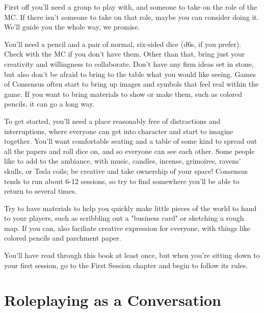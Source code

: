 \documentclass[
  oneside,
  statementpaper,
  9pt]{memoir}
\begin{document}
\begin{Player}

First off you'll need a group to play with, and someone to take on the role of the MC. If there isn't someone to take on that role, maybe you can consider doing it. We'll guide you the whole way, we promise.

You'll need a pencil and a pair of normal, six-sided dice (d6s, if you prefer). Check with the MC if you don't have them. Other than that, bring just your creativity and willingness to collaborate. Don't have any firm ideas set in stone, but also don't be afraid to bring to the table what you would like seeing. Games of Consensus often start to bring up images and symbols that feel real within the game. If you want to bring materials to show or make them, such as colored pencils, it can go a long way.

\end{Player}

\begin{MC}

To get started, you’ll need a place reasonably free of distractions and interruptions, where everyone can get into character and start to imagine together. You’ll want comfortable seating and a table of some kind to spread out all the papers and roll dice on, and so everyone can see each other. Some people like to add to the ambiance, with music, candles, incense, grimoires, ravens’ skulls, or Tesla coils; be creative and take ownership of your space! Consensus tends to run about 6-12 sessions, so try to find somewhere you’ll be able to return to several times.

Try to have materials to help you quickly make little pieces of the world to hand to your players, such as scribbling out a "business card" or sketching a rough map. If you can, also faciliate creative expression for everyone,  with things like colored pencils and parchment paper.

You'll have read through this book at least once, but when you're sitting down to your first session, go to the First Session chapter and begin to follow its rules.

\end{MC}

\hypertarget{roleplaying-as-a-conversation}{%
\section{Roleplaying as a
Conversation}\label{roleplaying-as-a-conversation}}
\end{document}
